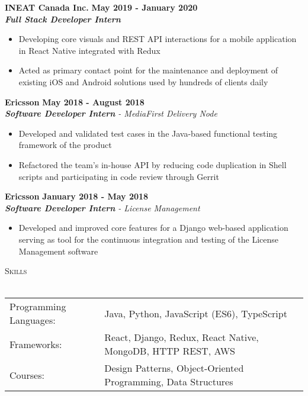 \documentclass[a4paper]{article}
\newcommand{\lineunder} {
    \vspace*{-8pt} \\
    \hspace*{-18pt} \hrulefill \\
}
\newcommand{\header} [1] {
    {\hspace*{-18pt}\vspace*{6pt} \textsc{#1}}
    \vspace*{-6pt} \lineunder
}
\begin{document}
\textbf{INEAT Canada Inc.} \hfill \textbf{May 2019 - January 2020}\\
\textit{\textbf{Full Stack Developer Intern}}\\
\vspace{0.2mm}
\begin{itemize} \itemsep 0.3pt
	\item Developing core visuals and REST API interactions for a mobile application in React Native integrated with Redux
	\item Acted as primary contact point for the maintenance and deployment of existing iOS and Android solutions used by hundreds of clients daily
\end{itemize}
\textbf{Ericsson} \hfill \textbf{May 2018 - August 2018}\\
\textit{\textbf{Software Developer Intern} - MediaFirst Delivery Node} \\
\vspace{0.2mm}
\begin{itemize} \itemsep 0.3pt
	\item Developed and validated test cases in the Java-based functional testing framework of the product
	\item Refactored the team's in-house API by reducing code duplication in Shell scripts and participating in code review through Gerrit
\end{itemize}
\textbf{Ericsson} \hfill \textbf{January 2018 - May 2018}\\
\textit{\textbf{Software Developer Intern} - License Management} \\
\vspace{0.2mm}
\begin{itemize} \itemsep 0.3pt
	\item Developed and improved core features for a Django web-based application serving as tool for the continuous integration and testing of the License Management software
\end{itemize}

\header{Skills}
\vspace*{2mm}
\begin{tabular}{ l l }
	Programming Languages: & Java, Python, JavaScript (ES6), TypeScript                             \\
	Frameworks:            & React, Django, Redux, React Native, MongoDB, HTTP REST, AWS \\
	Courses:               & Design Patterns, Object-Oriented Programming, Data Structures       \\
\end{tabular}
\vspace{2mm}
\end{document}
